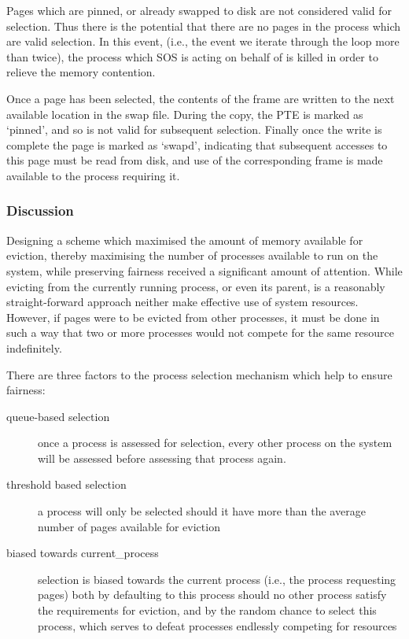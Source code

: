 \documentclass[a4paper,12pt]{article}
\begin{document}
Pages which are pinned, or already swapped to disk are not considered valid
for selection.  Thus there is the potential that there are no pages in the
process which are valid selection.  In this event, (i.e., the event we iterate
through the loop more than twice), the process which SOS is acting on behalf
of is killed in order to relieve the memory contention.

Once a page has been selected, the contents of the frame are written to the
next available location in the swap file.  During the copy, the PTE is marked
as `pinned', and so is not valid for subsequent selection.  Finally once the
write is complete the page is marked as `swapd', indicating that subsequent
accesses to this page must be read from disk, and use of the corresponding
frame is made available to the process requiring it.

\subsubsection{Discussion}
Designing a scheme which maximised the amount of memory available for
eviction, thereby maximising the number of processes available to run on the
system, while preserving fairness received a significant amount of attention.
While evicting from the currently running process, or even its parent, is a
reasonably straight-forward approach neither make effective use of system
resources.  However, if pages were to be evicted from other processes, it must
be done in such a way that two or more processes would not compete for the
same resource indefinitely.

There are three factors to the process selection mechanism which help to
ensure fairness:
\begin{description}
\item[queue-based selection] once a process is assessed for selection, every
  other process on the system will be assessed before assessing that process
  again.
\item[threshold based selection] a process will only be selected should it
  have more than the average number of pages available for eviction
\item[biased towards current\_process] selection is biased towards the current
  process (i.e., the process requesting pages) both by defaulting to this
  process should no other process satisfy the requirements for eviction, and
  by the random chance to select this process, which serves to defeat
  processes endlessly competing for resources
\end{description}
\end{document}

